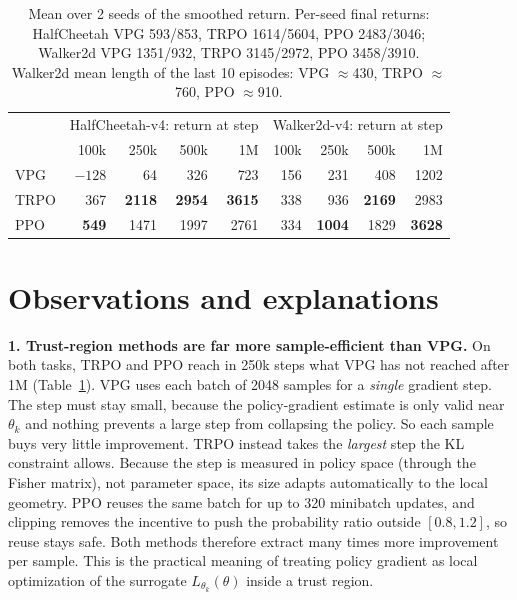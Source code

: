 \documentclass[10pt]{article}
\begin{document}
\begin{table}[h]
\centering\small
\begin{tabular}{lrrrr|rrrr}
\toprule
& \multicolumn{4}{c|}{HalfCheetah-v4: return at step} & \multicolumn{4}{c}{Walker2d-v4: return at step} \\
& 100k & 250k & 500k & 1M & 100k & 250k & 500k & 1M \\
\midrule
VPG  & $-128$ & 64   & 326  & 723  & 156 & 231  & 408  & 1202 \\
TRPO & 367    & \textbf{2118} & \textbf{2954} & \textbf{3615} & 338 & 936  & \textbf{2169} & 2983 \\
PPO  & \textbf{549} & 1471 & 1997 & 2761 & 334 & \textbf{1004} & 1829 & \textbf{3628} \\
\bottomrule
\end{tabular}
\caption{Mean over 2 seeds of the smoothed return. Per-seed final returns: HalfCheetah VPG 593/853, TRPO 1614/5604, PPO 2483/3046; Walker2d VPG 1351/932, TRPO 3145/2972, PPO 3458/3910. Walker2d mean length of the last 10 episodes: VPG $\approx$430, TRPO $\approx$760, PPO $\approx$910.}
\label{tab:res}
\end{table}

\section{Observations and explanations}

\textbf{1. Trust-region methods are far more sample-efficient than VPG.}
On both tasks, TRPO and PPO reach in 250k steps what VPG has not reached after 1M (Table~\ref{tab:res}).
VPG uses each batch of 2048 samples for a \emph{single} gradient step.
The step must stay small, because the policy-gradient estimate is only valid near $\theta_k$ and nothing prevents a large step from collapsing the policy.
So each sample buys very little improvement.
TRPO instead takes the \emph{largest} step the KL constraint allows.
Because the step is measured in policy space (through the Fisher matrix), not parameter space, its size adapts automatically to the local geometry.
PPO reuses the same batch for up to 320 minibatch updates, and clipping removes the incentive to push the probability ratio outside $[0.8,1.2]$, so reuse stays safe.
Both methods therefore extract many times more improvement per sample.
This is the practical meaning of treating policy gradient as local optimization of the surrogate $L_{\theta_k}(\theta)$ inside a trust region.
\end{document}

